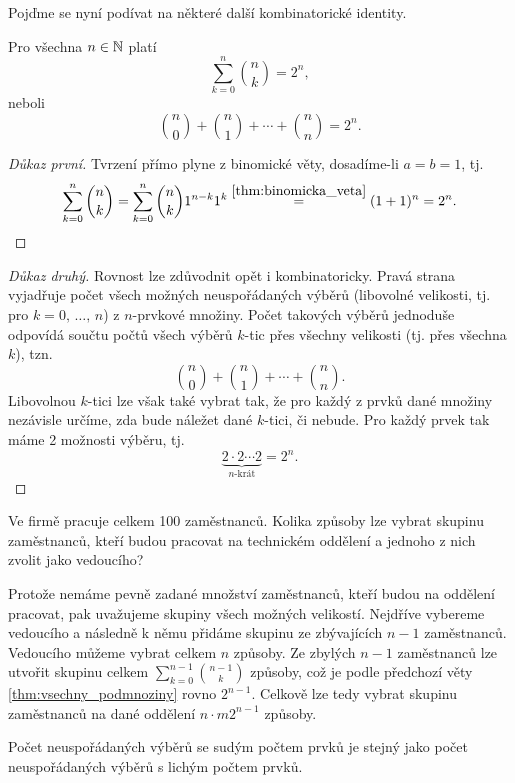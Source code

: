 Pojďme se nyní podívat na některé další kombinatorické identity.
\begin{theorem}\label{thm:vsechny_podmnoziny}
    Pro všechna $n\in\mathbb{N}$ platí
    \[\sum_{k=0}^{n}\binom{n}{k}=2^n,\]
    neboli
    \[\binom{n}{0}+\binom{n}{1}+\cdots+\binom{n}{n}=2^n.\]
\end{theorem}
\begin{proof}[Důkaz první]
    Tvrzení přímo plyne z binomické věty, dosadíme-li $a=b=1$, tj.
    \[\sum_{k=0}^{n}\binom{n}{k}=\sum_{k=0}^{n}\binom{n}{k}1^{n-k}1^k\stackrel{\ref{thm:binomicka_veta}}{=}(1+1)^n=2^n.\]
\end{proof}
\begin{proof}[Důkaz druhý]
    Rovnost lze zdůvodnit opět i kombinatoricky. Pravá strana vyjadřuje počet všech možných neuspořádaných výběrů (libovolné velikosti, tj. pro $k=0,\,\dots,\,n$) z $n$-prvkové množiny. Počet takových výběrů jednoduše odpovídá součtu počtů všech výběrů $k$-tic přes všechny velikosti (tj. přes všechna $k$), tzn.
    \[\binom{n}{0}+\binom{n}{1}+\cdots+\binom{n}{n}.\]
    Libovolnou $k$-tici lze však také vybrat tak, že pro každý z prvků dané množiny nezávisle určíme, zda bude náležet dané $k$-tici, či nebude. Pro každý prvek tak máme 2 možnosti výběru, tj.
    \[\underbrace{2\cdot 2\cdots 2}_{n\text{-krát}}=2^n.\]
\end{proof}
\begin{task}
    Ve firmě pracuje celkem 100 zaměstnanců. Kolika způsoby lze vybrat skupinu zaměstnanců, kteří budou pracovat na technickém oddělení a jednoho z nich zvolit jako vedoucího?
\end{task}
\begin{solution}
    Protože nemáme pevně zadané množství zaměstnanců, kteří budou na oddělení pracovat, pak uvažujeme skupiny všech možných velikostí. Nejdříve vybereme vedoucího a následně k němu přidáme skupinu ze zbývajících $n-1$ zaměstnanců. Vedoucího můžeme vybrat celkem $n$ způsoby. Ze zbylých $n-1$ zaměstnanců lze utvořit skupinu celkem $\sum_{k=0}^{n-1}\binom{n-1}{k}$ způsoby, což je podle předchozí věty \ref{thm:vsechny_podmnoziny} rovno $2^{n-1}$. Celkově lze tedy vybrat skupinu zaměstnanců na dané oddělení $n\cdot m2^{n-1}$ způsoby.
\end{solution}
\begin{theorem}
    Počet neuspořádaných výběrů se sudým počtem prvků je stejný jako počet neuspořádaných výběrů s lichým počtem prvků.
\end{theorem}
